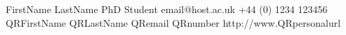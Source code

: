 \documentclass{ecr_card}
\begin{document}
\vcardfront
	{FirstName LastName}
	{PhD Student}
	{email@host.ac.uk}
	{+44 (0) 1234 123456}
	{QRFirstName} %
	{QRLastName}
	{QRemail}
	{QRnumber}
	{http://www.QRpersonalurl}
\vcardback{}
\end{document}
